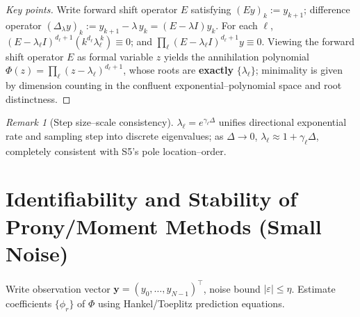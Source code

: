 \documentclass[11pt,a4paper]{article}
\theoremstyle{remark}
\newtheorem{remark}[theorem]{Remark}
\begin{document}
\begin{proof}[Key points]
Write forward shift operator $E$ satisfying $(Ey)_k:=y_{k+1}$; difference operator $(\Delta_{\lambda}y)_k:=y_{k+1}-\lambda\,y_k=(E-\lambda I)y_k$. For each $\ell$, $(E-\lambda_\ell I)^{d_\ell+1}(k^{d_\ell}\lambda_\ell^{\,k})\equiv 0$; and $\prod_\ell (E-\lambda_\ell I)^{d_\ell+1}y\equiv 0$. Viewing the forward shift operator $E$ as formal variable $z$ yields the annihilation polynomial $\Phi(z)=\prod_\ell(z-\lambda_\ell)^{d_\ell+1}$, whose roots are \textbf{exactly} $\{\lambda_\ell\}$; minimality is given by dimension counting in the confluent exponential--polynomial space and root distinctness.
\end{proof}

\begin{remark}[Step size--scale consistency]
$\lambda_\ell=e^{\gamma_\ell\Delta}$ unifies directional exponential rate and sampling step into discrete eigenvalues; as $\Delta\to0$, $\lambda_\ell\approx 1+\gamma_\ell\Delta$, completely consistent with S5's pole location--order.
\end{remark}

\section{Identifiability and Stability of Prony/Moment Methods (Small Noise)}

Write observation vector $\mathbf{y}=(y_0,\dots,y_{N-1})^\top$, noise bound $|\varepsilon|\le \eta$. Estimate coefficients $\{\phi_r\}$ of $\Phi$ using Hankel/Toeplitz prediction equations.
\end{document}
